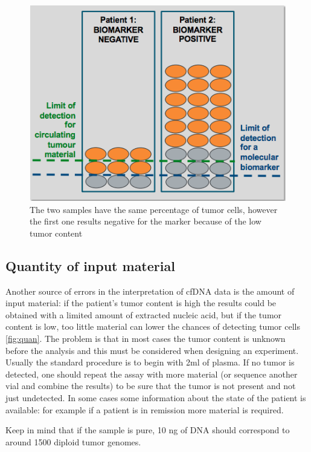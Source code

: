 \begin{figure}[!ht]
\centering
    \includegraphics[width=0.4\linewidth]{norm.png}
    \caption{\label{fig:norm}The two samples have the same percentage of tumor cells, however the first one results negative for the marker because of the low tumor content}
\end{figure}

\subsection{Quantity of input material}
Another source of errors in the interpretation of cfDNA data is the amount of input material: if the patient's tumor content is high the results could be obtained with a limited amount of extracted nucleic acid, but if the tumor content is low, too little material can lower the chances of detecting tumor cells \ref{fig:quan}. The problem is that in most cases the tumor content is unknown before the analysis and this must be considered when designing an experiment. Usually the standard procedure is to begin with 2ml of plasma. If no tumor is detected, one should repeat the assay with more material (or sequence another vial and combine the results) to be sure that the tumor is not present and not just undetected. In some cases some information about the state of the patient is available: for example if a patient is in remission more material is required.

Keep in mind that if the sample is pure, 10 ng of DNA should correspond to around 1500 diploid tumor genomes.

